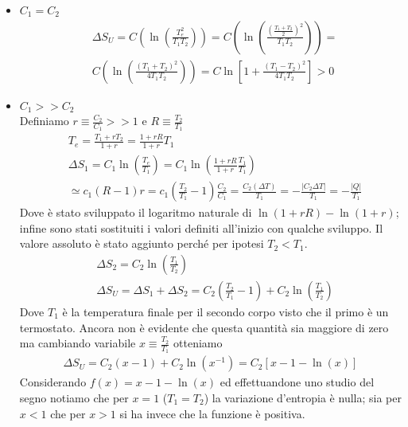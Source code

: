 \documentclass[10pt,a4paper]{article}
\begin{document}
\begin{itemize}
	\item \(C_1=C_2\)\\
	\begin{align*}
		&\Delta S_U = C\left(\ln\left(\frac{T_e^2}{T_1T_2}\right) \right) = C\left(\ln\left(\frac{(\frac{T_1 + T_2}{2})^2}{T_1T_2}\right) \right)=\\
		&C\left(\ln\left(\frac{(T_1 + T_2)^2}{4T_1T_2}\right) \right)=C \ln\left[1 + \frac{(T_1 - T_2)^2}{4T_1T_2}\right]>0
	\end{align*}
	\item \(C_1>>C_2\)\\
	Definiamo \(r \equiv \frac{C_2}{C_1}>>1\) e \(R \equiv \frac{T_2}{T_1}\)
	\begin{align*}
		&T_e = \frac{T_1 + r T_2}{1+r}= \frac{1+rR}{1+r}T_1\\
		&\Delta S_1 = C_1 \ln\left(\frac{T_e}{T_1}\right) = C_1 \ln\left(\frac{1+rR}{1+r}\frac{T_1}{T_1}\right)\\
		&\simeq c_1(R-1)r = c_1(\frac{T_2}{T_1}-1) \frac{C_2}{C_1} = \frac{C_2 (\Delta T)}{T_1} = -\frac{|C_2\Delta T|}{T_1}=-\frac{|Q|}{T_1}
	\end{align*}
	Dove è stato sviluppato il logaritmo naturale di \(\ln(1+rR)-\ln(1+r)\); infine sono stati sostituiti i valori definiti all'inizio con qualche sviluppo. Il valore assoluto è stato aggiunto perché per ipotesi \(T_2<T_1\).
	\begin{align*}
		&\Delta S_2 = C_2 \ln\left(\frac{T_1}{T_2}\right)\\
		&\Delta S_U = \Delta S_1 + \Delta S_2 = C_2 \left(\frac{T_2}{T_1}-1\right) +  C_2 \ln\left(\frac{T_1}{T_2}\right) 
	\end{align*}
	Dove \(T_1\) è la temperatura finale per il secondo corpo visto che il primo è un termostato. Ancora non è evidente che questa quantità sia maggiore di zero ma cambiando variabile \(x \equiv \frac{T_2}{T_1}\) otteniamo
	\begin{align*}
		\Delta S_U = C_2(x-1)+ C_2\ln(x^{-1}) = C_2\left[x-1-\ln(x)\right]
	\end{align*}
	Considerando \(f(x) = x-1-\ln(x)\) ed effettuandone uno studio del segno notiamo che per \(x=1\) (\(T_1= T_2\)) la variazione d'entropia è nulla; sia per \(x<1\) che per \(x>1\) si ha invece che la funzione è positiva. 
\end{itemize}
\end{document}
